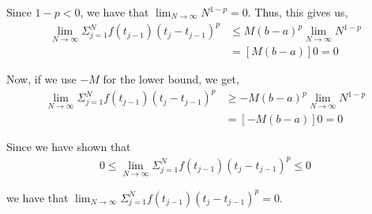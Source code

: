 \documentclass[12pt]{article}
\newenvironment{problem}[2][Problem]{\begin{trivlist}
\item[\hskip \labelsep {\bfseries #1}\hskip \labelsep {\bfseries #2.}]}{\end{trivlist}}
\begin{document}
Since $1-p < 0$, we have that $\lim_{N \to \infty} N^{1-p} = 0$. Thus, this gives us,
\begin{align*}
\lim_{N \to \infty} \Sigma^N_{j=1} f(t_{j-1})(t_j - t_{j-1})^p &\leq M(b-a)^p \lim_{N \to \infty} N^{1-p}\\
&= [M(b-a)]0 = 0
\end{align*}

Now, if we use $-M$ for the lower bound, we get,
\begin{align*}
\lim_{N \to \infty} \Sigma^N_{j=1} f(t_{j-1})(t_j - t_{j-1})^p &\geq -M(b-a)^p \lim_{N \to \infty} N^{1-p}\\
&= [-M(b-a)]0 = 0
\end{align*}

Since we have shown that
\begin{align*}
0 \leq \lim_{N \to \infty} \Sigma^N_{j=1} f(t_{j-1})(t_j - t_{j-1})^p \leq 0
\end{align*}

we have that $\lim_{N \to \infty} \Sigma^N_{j=1} f(t_{j-1})(t_j - t_{j-1})^p = 0$.

\begin{problem}{10}
\end{problem}
\end{document}
